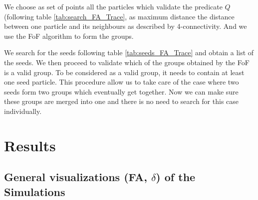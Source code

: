 \documentclass[12pt]{article}
\begin{document}
\begin{par}
We choose as set of points all the
particles which validate the predicate $Q$ (following table
\ref{tab:search_FA_Trace}, as maximum distance the distance
between one particle and its neighbours as described by
4-connectivity. And we use the FoF algorithm to form the groups. 
\end{par}
\begin{par}
We search for the seeds following table \ref{tab:seeds_FA_Trace}
and obtain a list of the seeds. We then proceed to validate which
of the groups obtained by the FoF is a valid group. To be
considered as a valid group, it needs to contain at least one seed
particle. This procedure allow us to take care of the case where
two seeds form two groups which eventually get together. Now we
can make sure these groups are merged into one and there is no
need to search for this case individually.
\end{par}


\section{Results}

\subsection{General visualizations (FA, $\delta$) of the Simulations}
\end{document}
